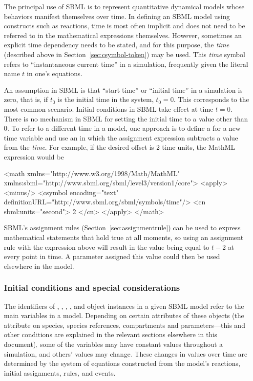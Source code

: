The principal use of SBML is to represent quantitative dynamical
models whose behaviors manifest themselves over time.  In defining
an SBML model using constructs such as reactions, time is most
often implicit and does not need to be referred to in the
mathematical expressions themselves.  However, sometimes an
explicit time dependency needs to be stated, and for this purpose,
the \emph{time}  (described above in
Section~\ref{sec:csymbol-token}) may be used.  This \emph{time}
symbol refers to ``instantaneous current time'' in a simulation,
frequently given the literal name $t$ in one's equations.

An assumption in SBML is that ``start time'' or ``initial time''
in a simulation is zero, that is, if $t_0$ is the initial time in
the system, $t_0 = 0$.  This corresponds to the most common
scenario.  Initial conditions in SBML take effect at time $t = 0$.
There is no mechanism in SBML for setting the initial time to a
value other than 0.  To refer to a different time in a model, one
approach is to define a \Parameter for a new time variable and use
an \AssignmentRule in which the assignment expression subtracts a
value from the  \emph{time}.  For example, if the
desired offset is 2 time units, the MathML expression would be

\begin{example}
<math xmlns="http://www.w3.org/1998/Math/MathML"
      xmlns:sbml="http://www.sbml.org/sbml/level3/version1/core">
    <apply>
        <minus/>
        <csymbol encoding="text" definitionURL="http://www.sbml.org/sbml/symbols/time"/> 
        <cn sbml:units="second"> 2 </cn>
    </apply>
</math>
\end{example}

SBML's assignment rules (Section~\ref{sec:assignmentrule}) can be
used to express mathematical statements that hold true at all
moments, so using an assignment rule with the expression above
will result in the value being equal to $t - 2$ at every point in
time.  A parameter assigned this value could then be used
elsewhere in the model.


\subsubsection{Initial conditions and special considerations}
\label{sec:before-t0}

The identifiers of \Species, \SpeciesReference, \Compartment, \Parameter, and
\Reaction object instances in a given SBML model refer to the main
variables in a model.  Depending on certain attributes of these
objects (\eg the attribute  on species, species references, compartments
and parameters---this and other conditions are explained in the
relevant sections elsewhere in this document), some of the
variables may have constant values throughout a simulation, and
others' values may change.  These changes in values over time are
determined by the system of equations constructed from the model's
reactions, initial assignments, rules, and events.

